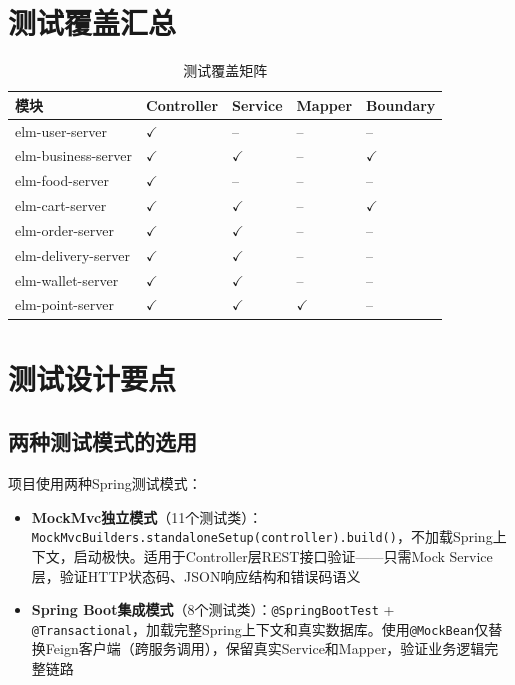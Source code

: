 \section{测试覆盖汇总}

\begin{table}[H]
	\centering
	\caption{测试覆盖矩阵}
	\begin{tabular}{p{4.5cm}p{2.5cm}p{2.5cm}p{2.5cm}p{2.5cm}}
		\hline
		\textbf{模块} & \textbf{Controller} & \textbf{Service} & \textbf{Mapper} & \textbf{Boundary} \\
		\hline
		elm-user-server & $\checkmark$ & -- & -- & -- \\
		elm-business-server & $\checkmark$ & $\checkmark$ & -- & $\checkmark$ \\
		elm-food-server & $\checkmark$ & -- & -- & -- \\
		elm-cart-server & $\checkmark$ & $\checkmark$ & -- & $\checkmark$ \\
		elm-order-server & $\checkmark$ & $\checkmark$ & -- & -- \\
		elm-delivery-server & $\checkmark$ & $\checkmark$ & -- & -- \\
		elm-wallet-server & $\checkmark$ & $\checkmark$ & -- & -- \\
		elm-point-server & $\checkmark$ & $\checkmark$ & $\checkmark$ & -- \\
		\hline
	\end{tabular}
\end{table}

\section{测试设计要点}

\subsection{两种测试模式的选用}

项目使用两种Spring测试模式：

\begin{itemize}
	\item \textbf{MockMvc独立模式}（11个测试类）：\verb|MockMvcBuilders.standaloneSetup(controller).build()|，不加载Spring上下文，启动极快。适用于Controller层REST接口验证——只需Mock Service层，验证HTTP状态码、JSON响应结构和错误码语义
	\item \textbf{Spring Boot集成模式}（8个测试类）：\verb|@SpringBootTest| + \verb|@Transactional|，加载完整Spring上下文和真实数据库。使用\verb|@MockBean|仅替换Feign客户端（跨服务调用），保留真实Service和Mapper，验证业务逻辑完整链路
\end{itemize}

